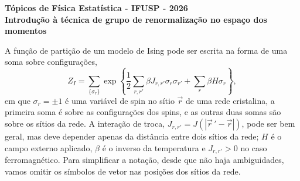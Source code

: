 \documentclass[12pt,a4paper]{article}
\newcounter{corr}
\begin{document}
\begin{center}
{\large\bfseries Tópicos de Física Estatística - IFUSP - 2026}\\[2pt]
{\large\bfseries Introdução à técnica de grupo de renormalização no espaço dos momentos}\\[8pt]
\end{center}

\bigskip

A função de partição de um modelo de Ising pode ser escrita na forma de
uma soma sobre configurações,
\begin{equation}
Z_I=\sum_{\{\sigma_r\}}\exp\left\{\frac12\sum_{r,r'}\beta J_{r,r'}\sigma_r\sigma_{r'}
+\sum_r\beta H\sigma_r\right\},
\end{equation}
em que $\sigma_r=\pm1$ é uma variável de spin no sítio $\vec r$ de uma rede cristalina,
a primeira soma é sobre as configurações dos spins, e as outras duas somas
são sobre os sítios da rede. A interação de troca,
$J_{r,r'}=J\left(|\vec r\,'-\vec r|\right)$, pode
ser bem geral, mas deve depender apenas da distância entre dois sítios da
rede; $H$ é o campo externo aplicado, $\beta$ é o inverso da temperatura e $J_{r,r'}>0$
no caso ferromagnético. Para simplificar a notação, desde que não haja
ambiguidades, vamos omitir os símbolos de vetor nas posições dos sítios da
rede.
\end{document}
